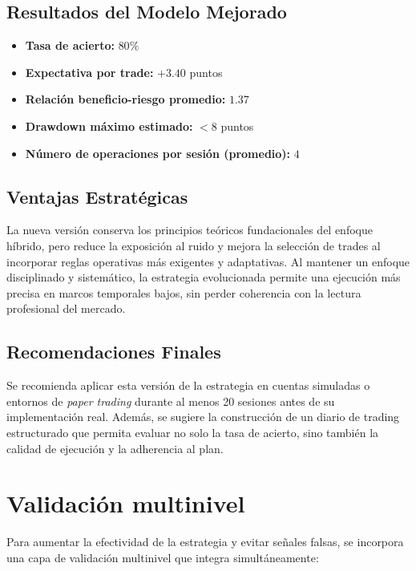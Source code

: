 \subsection{Resultados del Modelo Mejorado}

\begin{itemize}
    \item \textbf{Tasa de acierto:} $80\%$
    \item \textbf{Expectativa por trade:} $+3.40$ puntos
    \item \textbf{Relaci\'on beneficio-riesgo promedio:} $1.37$
    \item \textbf{Drawdown m\'aximo estimado:} $<8$ puntos
    \item \textbf{Número de operaciones por sesión (promedio):} $4$
\end{itemize}

\subsection{Ventajas Estratégicas}

La nueva versi\'on conserva los principios te\'oricos fundacionales del enfoque h\'ibrido, pero reduce la exposici\'on al ruido y mejora la selecci\'on de trades al incorporar reglas operativas m\'as exigentes y adaptativas. Al mantener un enfoque disciplinado y sistem\'atico, la estrategia evolucionada permite una ejecuci\'on m\'as precisa en marcos temporales bajos, sin perder coherencia con la lectura profesional del mercado.

\subsection{Recomendaciones Finales}

Se recomienda aplicar esta versi\'on de la estrategia en cuentas simuladas o entornos de \textit{paper trading} durante al menos 20 sesiones antes de su implementaci\'on real. Adem\'as, se sugiere la construcci\'on de un diario de trading estructurado que permita evaluar no solo la tasa de acierto, sino tambi\'en la calidad de ejecuci\'on y la adherencia al plan.

\section{Validaci\'on multinivel}

Para aumentar la efectividad de la estrategia y evitar se\~nales falsas, se incorpora una capa de validaci\'on multinivel que integra simult\'aneamente:

